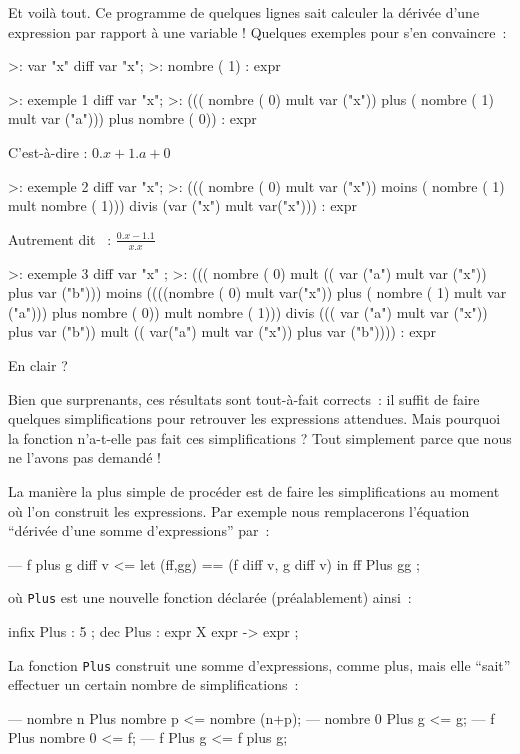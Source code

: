 Et voilà tout. Ce programme de quelques lignes sait calculer la
dérivée d'une expression par rapport à une variable ! Quelques
exemples pour s'en convaincre~:
\begin{verbatimtab}
>: var "x" diff var "x";
>:  nombre ( 1) : expr

>: exemple 1 diff var "x";
>: ((( nombre ( 0) mult  var ("x")) plus ( nombre ( 1) mult  var ("a"))) 
plus  nombre ( 0)) : expr
\end{verbatimtab}
C'est-à-dire : $0.x + 1.a + 0$ 
\begin{verbatimtab}
>: exemple 2 diff var "x";
>: ((( nombre ( 0) mult  var ("x")) moins ( nombre ( 1) mult  nombre ( 1))) 
divis (var ("x") mult  var("x"))) : expr
\end{verbatimtab}
Autrement dit ~: $\frac{0.x - 1.1}{x.x}$
\begin{verbatimtab}
>: exemple 3 diff var "x" ;
>: ((( nombre ( 0) mult (( var ("a") mult  var ("x")) plus  var ("b"))) 
moins ((((nombre ( 0) mult  var("x")) plus ( nombre ( 1) mult  var ("a"))) 
plus  nombre ( 0)) mult nombre ( 1))) divis ((( var ("a") mult  var ("x")) 
plus  var ("b")) mult (( var("a") mult var ("x")) plus  var ("b")))) : expr
\end{verbatimtab}
En clair ?


Bien que surprenants, ces résultats sont tout-à-fait corrects~: il
suffit de faire quelques simplifications pour retrouver les
expressions attendues. Mais pourquoi la fonction n'a-t-elle pas fait
ces simplifications ? Tout simplement parce que nous ne l'avons pas
demandé !

La manière la plus simple de procéder est de faire les simplifications
au moment o\`u l'on construit les expressions. Par exemple nous
remplacerons l'équation ``dérivée d'une somme d'expressions'' par~:
\begin{verbatimtab}
--- f plus g	diff  v	<= let (ff,gg) == (f diff v, g diff v)
				in ff Plus gg ;
\end{verbatimtab}
o\`u \verb+Plus+ est une nouvelle fonction déclarée (préalablement) ainsi~:
\begin{verbatimtab}
infix Plus : 5 ;
dec Plus : expr X expr -> expr ;
\end{verbatimtab}
La fonction \verb+Plus+ construit une somme d'expressions, comme plus,
mais elle ``sait'' effectuer un certain nombre de simplifications~:
\begin{verbatimtab}
--- nombre n	Plus 	nombre p 	<= nombre (n+p);
--- nombre 0	Plus 	g      		<= g;
--- f 		Plus 	nombre 0 	<= f;
--- f          	Plus 	g      		<= f plus g;

\end{verbatimtab}


